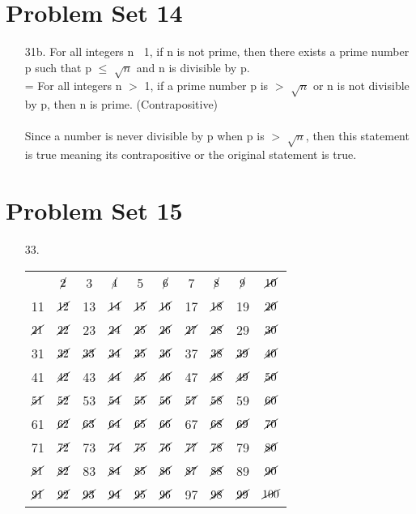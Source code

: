 \documentclass[12pt]{article}
\begin{document}
\section*{Problem Set 14}
\begin{itemize}
    \item [31b.]
        For all integers n $\>$ 1, if n is not prime, then there exists a prime number
        p such that p $\leq$ $\sqrt{n}$ and n is divisible by p. \\
        = For all integers n $>$ 1, if a prime number p is $>$ $\sqrt{n}$ or n is not
        divisible by p, then n is prime. (Contrapositive)\\
        \\
        Since a number is never divisible by p when p is $>$ $\sqrt{n}$, then this
        statement is true meaning its contrapositive or the original statement is true.
\end{itemize}

\section*{Problem Set 15}
\begin{itemize}
    \item [33.]
        \begin{tabular}{cccccccccc}
               & $\cancel{2}$  & 3  & $\cancel{4}$  & 5  & $\cancel{6}$  & 7  & $\cancel{8}$  & $\cancel{9 }$ & $\cancel{10}$ \\
            11 & $\cancel{12}$ & 13 & $\cancel{14}$ & $\cancel{15}$ & $\cancel{16}$ & 17 & $\cancel{18}$ & 19 & $\cancel{20}$ \\
            $\cancel{21}$ & $\cancel{22}$ & 23 & $\cancel{24}$ & $\cancel{25}$ & $\cancel{26}$ & $\cancel{27}$ & $\cancel{28}$ & 29 & $\cancel{30}$ \\
            31 & $\cancel{32}$ & $\cancel{33}$ & $\cancel{34}$ & $\cancel{35}$ & $\cancel{36}$ & 37 & $\cancel{38}$ & $\cancel{39}$ & $\cancel{40}$ \\
            41 & $\cancel{42}$ & 43 & $\cancel{44}$ & $\cancel{45}$ & $\cancel{46}$ & 47 & $\cancel{48}$ & $\cancel{49}$ & $\cancel{50}$ \\
            $\cancel{51}$ & $\cancel{52}$ & 53 & $\cancel{54}$ & $\cancel{55}$ & $\cancel{56}$ & $\cancel{57}$ & $\cancel{58}$ & 59 & $\cancel{60}$ \\
            61 & $\cancel{62}$ & $\cancel{63}$ & $\cancel{64}$ & $\cancel{65}$ & $\cancel{66}$ & 67 & $\cancel{68}$ & $\cancel{69}$ & $\cancel{70}$ \\
            71 & $\cancel{72}$ & 73 & $\cancel{74}$ & $\cancel{75}$ & $\cancel{76}$ & $\cancel{77}$ & $\cancel{78}$ & 79 & $\cancel{80}$ \\
            $\cancel{81}$ & $\cancel{82}$ & 83 & $\cancel{84}$ & $\cancel{85}$ & $\cancel{86}$ & $\cancel{87}$ & $\cancel{88}$ & 89 & $\cancel{90}$ \\
            $\cancel{91}$ & $\cancel{92}$ & $\cancel{93}$ & $\cancel{94}$ & $\cancel{95}$ & $\cancel{96}$ & 97 & $\cancel{98}$ & $\cancel{99}$ & $\cancel{100}$ \\
        \end{tabular}
\end{itemize}
\end{document}
